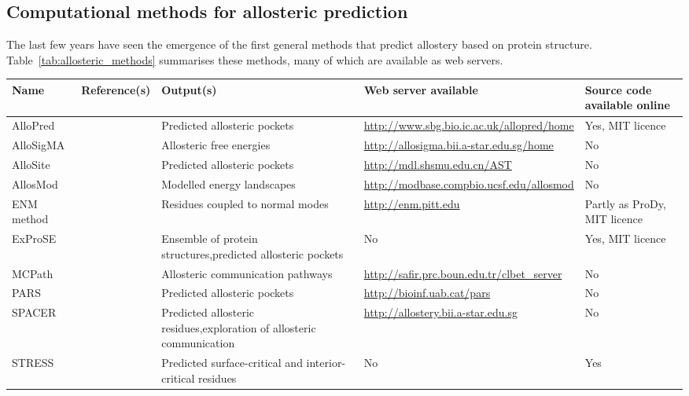 \subsection{Computational methods for allosteric prediction}

The last few years have seen the emergence of the first general methods that predict allostery based on protein structure.
Table~\ref{tab:allosteric_methods} summarises these methods, many of which are available as web servers.


\begin{table}
\centering

\begin{footnotesize}
\begin{tabular}{ l l p{5cm} l l }
\hline
Name & Reference(s) & Output(s) & Web server available & Source code available online \\
\hline
AlloPred & \cite{Greener2015} & Predicted allosteric pockets & \url{http://www.sbg.bio.ic.ac.uk/allopred/home} & Yes, MIT licence \\
AlloSigMA & \cite{Guarnera2017} & Allosteric free energies & \url{http://allosigma.bii.a-star.edu.sg/home} & No \\
AlloSite & \cite{Huang2013} & Predicted allosteric pockets & \url{http://mdl.shsmu.edu.cn/AST} & No \\ %
AllosMod & \cite{Weinkam2012} & Modelled energy landscapes & \url{http://modbase.compbio.ucsf.edu/allosmod} & No \\
ENM method & \cite{Li2017} & Residues coupled to normal modes & \url{http://enm.pitt.edu} & Partly as ProDy, MIT licence \\
ExProSE & \cite{Greener2017} & Ensemble of protein structures,\newline predicted allosteric pockets & No & Yes, MIT licence \\
MCPath & \cite{Kaya2013} & Allosteric communication pathways & \url{http://safir.prc.boun.edu.tr/clbet_server} & No \\
PARS & \cite{Panjkovich2014, Panjkovich2012} & Predicted allosteric pockets & \url{http://bioinf.uab.cat/pars} & No \\
SPACER & \cite{Goncearenco2013, Mitternacht2011} & Predicted allosteric residues,\newline exploration of allosteric communication & \url{http://allostery.bii.a-star.edu.sg} & No \\
STRESS & \cite{Clarke2016} & Predicted surface-critical and interior-critical residues & No & Yes \\
\hline
\end{tabular}
\end{footnotesize}


\end{table}
